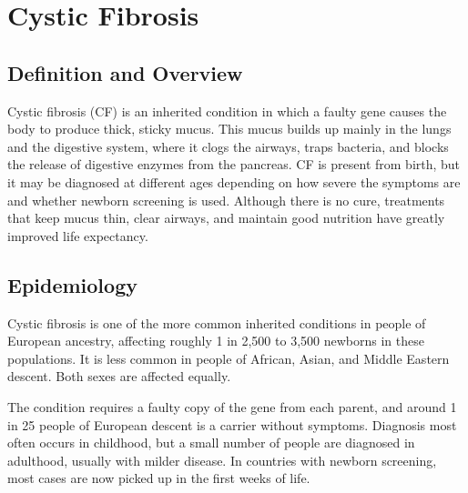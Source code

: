 \chapter{Cystic Fibrosis}

\section*{Definition and Overview}
Cystic fibrosis (CF) is an inherited condition in which a faulty gene causes the body to produce thick, sticky mucus. This mucus builds up mainly in the lungs and the digestive system, where it clogs the airways, traps bacteria, and blocks the release of digestive enzymes from the pancreas. CF is present from birth, but it may be diagnosed at different ages depending on how severe the symptoms are and whether newborn screening is used. Although there is no cure, treatments that keep mucus thin, clear airways, and maintain good nutrition have greatly improved life expectancy.

\section*{Epidemiology}
Cystic fibrosis is one of the more common inherited conditions in people of European ancestry, affecting roughly 1 in 2,500 to 3,500 newborns in these populations. It is less common in people of African, Asian, and Middle Eastern descent. Both sexes are affected equally.

The condition requires a faulty copy of the gene from each parent, and around 1 in 25 people of European descent is a carrier without symptoms. Diagnosis most often occurs in childhood, but a small number of people are diagnosed in adulthood, usually with milder disease. In countries with newborn screening, most cases are now picked up in the first weeks of life.

